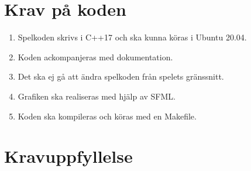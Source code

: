\documentclass{TDP005mall}
\begin{document}
\section{Krav på koden} %
\begin{enumerate}
\item    Spelkoden skrivs i C++17 och ska kunna köras i Ubuntu 20.04.
\item    Koden ackompanjeras med dokumentation.
\item    Det ska ej gå att ändra spelkoden från spelets gränssnitt.
\item    Grafiken ska realiseras med hjälp av SFML.
\item    Koden ska kompileras och köras med en Makefile.
\end{enumerate}

\section{Kravuppfyllelse}
\end{document}
